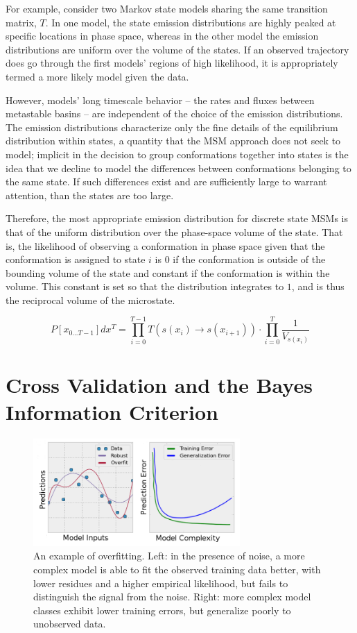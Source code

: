 \documentclass[twocolumn,floatfix,nofootinbib,aps]{revtex4-1}
\begin{document}
For example, consider two Markov state models sharing the same transition matrix, $T$. In one model, the state emission distributions are highly peaked at specific locations in phase space, whereas in the other model the emission distributions are uniform over the volume of the states. If an observed trajectory does go through the first models’ regions of high likelihood, it is appropriately termed a more likely model given the data.

However, models' long timescale behavior -- the rates and fluxes between metastable basins -- are independent of the choice of the emission distributions. The emission distributions characterize only the fine details of the equilibrium distribution within states, a quantity that the MSM approach does not seek to model; implicit in the decision to group conformations together into states is the idea that we decline to model the differences between conformations belonging to the same state. If such differences exist and are sufficiently large to warrant attention, than the states are too large.

Therefore, the most appropriate emission distribution for discrete state MSMs is that of the uniform distribution over the phase-space volume of the state. That is, the likelihood of observing a conformation in phase space given that the conformation is assigned to state $i$ is $0$ if the conformation is outside of the bounding volume of the state and constant if the conformation is within the volume. This constant is set so that the distribution integrates to $1$, and is thus the reciprocal volume of the microstate.

\begin{equation}
\label{eq:like_vol}
P[x_{0...T-1}] dx^T = \prod_{i=0}^{T-1} T(s(x_i) \rightarrow s(x_{i+1})) \cdot \prod_{i=0}^T \frac{1}{V_{s(x_{i})}}
\end{equation}

\section{Cross Validation and the Bayes Information Criterion}

\begin{figure}
\centering
\includegraphics[width=3.1in]{figs/overfitting.png}
\caption{An example of overfitting. Left: in the presence of noise, a more complex model is able to fit the observed training data better, with lower residues and a higher empirical likelihood, but fails to distinguish the signal from the noise. Right: more complex model classes exhibit lower training errors, but generalize poorly to unobserved data.}
\end{figure}
\end{document}
